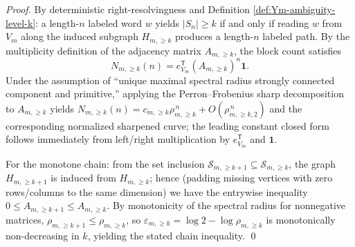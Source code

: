 \begin{proof}
By deterministic right-resolvingness and Definition \ref{def:Ym-ambiguity-level-k}: a length-\(n\) labeled word \(w\) yields \(|S_n|\ge k\) if and only if reading \(w\) from \(V_m\) along the induced subgraph \(H_{m,\ge k}\) produces a length-\(n\) labeled path.
By the multiplicity definition of the adjacency matrix \(A_{m,\ge k}\), the block count satisfies
\[
N_{m,\ge k}(n)=e_{V_m}^{\mathsf T}(A_{m,\ge k})^n\mathbf 1.
\]
Under the assumption of ``unique maximal spectral radius strongly connected component and primitive,'' applying the Perron--Frobenius sharp decomposition to \(A_{m,\ge k}\) yields
\(
N_{m,\ge k}(n)=c_{m,\ge k}\rho_{m,\ge k}^{\,n}+O(\rho_{m,\ge k,2}^{\,n})
\)
and the corresponding normalized sharpened curve; the leading constant closed form follows immediately from left/right multiplication by \(e_{V_m}^{\mathsf T}\) and \(\mathbf 1\).
\par
For the monotone chain: from the set inclusion \(\mathcal{S}_{m,\ge k+1}\subseteq\mathcal{S}_{m,\ge k}\), the graph \(H_{m,\ge k+1}\) is induced from \(H_{m,\ge k}\);
hence (padding missing vertices with zero rows/columns to the same dimension) we have the entrywise inequality \(0\le A_{m,\ge k+1}\le A_{m,\ge k}\).
By monotonicity of the spectral radius for nonnegative matrices, \(\rho_{m,\ge k+1}\le \rho_{m,\ge k}\), so \(\varepsilon_{m,\ge k}=\log 2-\log\rho_{m,\ge k}\) is monotonically non-decreasing in \(k\), yielding the stated chain inequality.
\qed
\end{proof}

